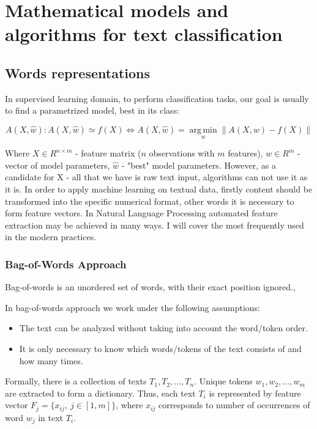 \chapter{Mathematical models and algorithms for text classification} \label{chapt2}

\section{Words representations} \label{sect2_1}


In supervised learning domain, to perform classification tasks, our goal is usually to find a parametrized model, best in its class: 

\begin{equation}
\label{eq:equation1}
A(X, \hat{w}): A(X, \hat{w}) \simeq f(X) \Leftrightarrow A(X, \hat{w}) = \operatorname*{arg\,min}_w \left\|A(X, w) - f(X)\right\|
\end{equation}

Where $X \in R^{ n\times m}$ - feature matrix ($n$ observations with $m$ features), $w \in R^{m}$ - vector of model parameters, $\hat{w}$ - "best" model parameters. However, as a candidate for X - all that we have is raw text input, algorithms can not use it as it is. In order to apply machine learning on textual data, firstly content should be transformed into the specific numerical format, other words it is necessary to form feature vectors. In Natural Language Processing automated feature extraction may be achieved in many ways. I will cover the most frequently used in the modern practices.

\subsection{Bag-of-Words Approach} \label{subsect2_1_1}

Bag-of-words is an unordered set of words, with their exact position ignored.\cite[p.641]{jurafsky}, 


\noindent In bag-of-words approach we work under the following assumptions:
\begin{itemize}
	\item The text can be analyzed without taking into account the word/token order.
	\item It is only necessary to know which words/tokens of the text consists of and how many times.
\end{itemize}

Formally, there is a collection of texts $T_1, T_2, ... , T_n$. Unique tokens $w_1, w_2, ..., w_m$ are extracted to form a dictionary. Thus, each text $T_i$ is represented by feature vector $F_j = \{x_{ij},\ j \in [1,m]\}$, where $x_{ij}$ corresponds to number of occurrences of word $w_j$ in text $T_i$.


